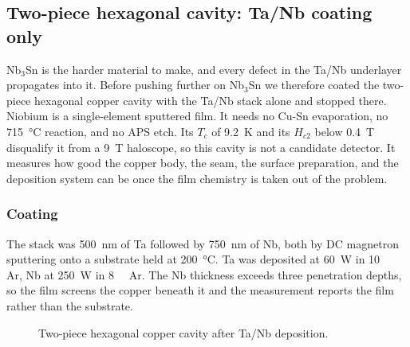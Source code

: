 \subsection{Two-piece hexagonal cavity: Ta/Nb coating only}\label{sec:tanb}
%
%

Nb$_3$Sn is the harder material to make, and every defect in the Ta/Nb underlayer propagates into it. Before pushing further on Nb$_3$Sn we therefore coated the two-piece hexagonal copper cavity with the Ta/Nb stack alone and stopped there. Niobium is a single-element sputtered film. It needs no Cu-Sn evaporation, no \qty{715}{\degreeCelsius} reaction, and no APS etch. Its $T_c$ of \qty{9.2}{\kelvin} and its $H_{c2}$ below \qty{0.4}{\tesla} disqualify it from a \qty{9}{\tesla} haloscope, so this cavity is not a candidate detector. It measures how good the copper body, the seam, the surface preparation, and the deposition system can be once the film chemistry is taken out of the problem.

\subsubsection{Coating}

The stack was \qty{500}{\nano\meter} of Ta followed by \qty{750}{\nano\meter} of Nb, both by DC magnetron sputtering onto a substrate held at \qty{200}{\degreeCelsius}. Ta was deposited at \qty{60}{\watt} in \qty{10}{\milli\torr} Ar, Nb at \qty{250}{\watt} in \qty{8}{\milli\torr} Ar. The Nb thickness exceeds three penetration depths, so the film screens the copper beneath it and the measurement reports the film rather than the substrate.

\begin{figure}[htb]
    \centering
    \caption{Two-piece hexagonal copper cavity after Ta/Nb deposition. }
    \label{fig:tanbCavity}
\end{figure}

